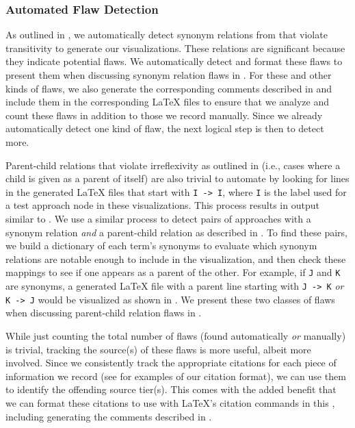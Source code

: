 \subsubsection{Automated Flaw Detection}\label{auto-flaw-detect}

As outlined in , we automatically detect synonym relations
from \ourApproachGlossary{} that violate transitivity to generate our
visualizations. These relations are significant because they indicate potential
flaws. We automatically detect and format these flaws to present them when
discussing synonym relation flaws in . %
For these and other kinds of flaws, we also generate the corresponding comments
described in  and include them in the
corresponding \LaTeX{} files to ensure that we analyze and count these flaws in
addition to those we record manually. Since we already automatically detect
one kind of flaw, the next logical step is then to detect more.

\ExampleFlawGraphs{}

\label{autoSelfPar}
Parent-child relations that violate irreflexivity as outlined in
 (i.e., cases where a child is given as a parent of itself)
are also trivial to automate by looking for lines in the generated \LaTeX{}
files that start with \texttt{I~->~I}, where \texttt{I} is the label used for a
test approach node in these visualizations. This process results in output
similar to .%
\label{autoParSyn} We use a similar process to detect pairs of
approaches with a synonym relation \emph{and} a parent-child relation as
described in . To find these pairs, we build a dictionary of
each term's synonyms to evaluate which synonym relations are notable enough
to include in the visualization, and then check these mappings to see if one
appears as a parent of the other. For example, if \texttt{J} and \texttt{K} are
synonyms, a generated \LaTeX{} file with a parent line starting with
\texttt{J~->~K} \emph{or} \texttt{K~->~J} would be visualized as shown in
. We present these two
classes of flaws when discussing parent-child relation flaws in .

While just counting the total number of flaws (found automatically \emph{or}
manually) is trivial, tracking
the source(s) of these flaws is more useful, albeit more involved. Since
we consistently track the appropriate citations for each piece of information
we record (see  for examples
of our citation format), we can use them to
identify the offending source tier(s). This comes with the added benefit that
we can format these citations to use with \LaTeX{}'s citation commands in this
\docType{}, including generating the comments described in
.

